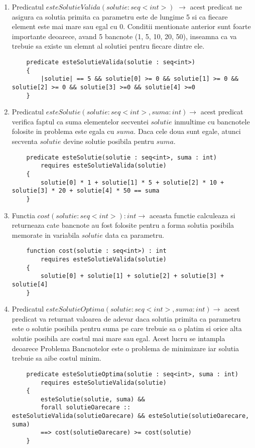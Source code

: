 \begin{enumerate}
	\item Predicatul $esteSolutieValida(solutie : seq<int>)$ $\rightarrow$ acest predicat ne asigura ca solutia primita ca parametru este de lungime 5 si ca fiecare element este mai mare sau egal cu 0. Conditii mentionate anterior sunt foarte importante deoarece, avand 5 bancnote (1, 5, 10, 20, 50), inseamna ca va trebuie sa existe un elemnt al solutiei pentru fiecare dintre ele.
	\par 
\begin{lstlisting}
	predicate esteSolutieValida(solutie : seq<int>)
	{
		|solutie| == 5 && solutie[0] >= 0 && solutie[1] >= 0 && 	solutie[2] >= 0 && solutie[3] >=0 && solutie[4] >=0
	}
\end{lstlisting}
\item Predicatul $esteSolutie(solutie : seq<int>, suma : int) \rightarrow$ acest predicat verifica faptul ca suma elementelor secventei $solutie$ inmultime cu bancnotele folosite in problema este egala cu $suma$. Daca cele doua sunt egale, atunci secventa $solutie$ devine solutie posibila pentru $suma$.
\begin{lstlisting}
	predicate esteSolutie(solutie : seq<int>, suma : int)
		requires esteSolutieValida(solutie)
	{
		solutie[0] * 1 + solutie[1] * 5 + solutie[2] * 10 + solutie[3] * 20 + solutie[4] * 50 == suma
	}
\end{lstlisting}
\vspace{1.5cm}
\item Functia $cost(solutie : seq<int>) : int \rightarrow$ aceasta functie calculeaza si returneaza cate bancnote au fost folosite pentru a forma solutia posibila memorate in variabila $solutie$ data ca parametru.
\begin{lstlisting}
	function cost(solutie : seq<int>) : int 
		requires esteSolutieValida(solutie)
	{
		solutie[0] + solutie[1] + solutie[2] + solutie[3] + solutie[4]
	}
\end{lstlisting}

\item Predicatul $ esteSolutieOptima(solutie : seq<int>, suma : int) \rightarrow$ acest predicat va returnat valoarea de adevar daca solutia primita ca parametru este o solutie posibila pentru suma pe  care trebuie sa o platim si orice alta solutie posibila are costul mai mare sau egal. Acest lucru se intampla deoarece Problema Bancnotelor este o problema de minimizare iar solutia trebuie sa aibe costul minim.
\begin{lstlisting}
	predicate esteSolutieOptima(solutie : seq<int>, suma : int)
		requires esteSolutieValida(solutie)
	{   
		esteSolutie(solutie, suma) &&
		forall solutieOarecare :: esteSolutieValida(solutieOarecare) && esteSolutie(solutieOarecare, suma) 
		==> cost(solutieOarecare) >= cost(solutie)
	}
\end{lstlisting}


\end{enumerate}

